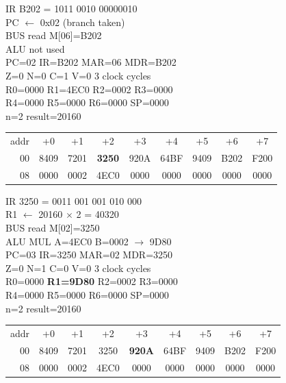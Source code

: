 \noindent\begin{tcolorbox}[stepbox, title={Step 32 \hfill PC 06 \quad BNE loop}]
\textcolor{dim}{IR} B202 = 1011 0010 00000010\\
PC $\leftarrow$ 0x02 (branch taken)\\
\textcolor{dim}{BUS} read M[06]=B202\\
\textcolor{dim}{ALU} \textcolor{dim}{not used}\\
PC=02 IR=B202 MAR=06 MDR=B202\\
Z=0 N=0 C=1 V=0 \hfill \textcolor{dim}{3 clock cycles}\\
R0=0000 R1=4EC0 R2=0002 R3=0000\\
R4=0000 R5=0000 R6=0000 SP=0000\\
\textcolor{dim}{n=2  result=20160}\\[1pt]
{\setlength{\tabcolsep}{1.6pt}\begin{tabular}{@{}r*{8}{c}@{}}
\textcolor{dim}{addr} & \textcolor{dim}{+0} & \textcolor{dim}{+1} & \textcolor{dim}{+2} & \textcolor{dim}{+3} & \textcolor{dim}{+4} & \textcolor{dim}{+5} & \textcolor{dim}{+6} & \textcolor{dim}{+7}\\
\textcolor{dim}{00} & 8409 & 7201 & \cellcolor{pcc}\textbf{3250} & 920A & 64BF & 9409 & B202 & F200\\
\textcolor{dim}{08} & 0000 & \cellcolor{datac}0002 & \cellcolor{datac}4EC0 & 0000 & 0000 & 0000 & 0000 & 0000\\
\end{tabular}}
\end{tcolorbox}\hfill\begin{tcolorbox}[stepbox, title={Step 33 \hfill PC 02 \quad MUL R1, R1, R2}]
\textcolor{dim}{IR} 3250 = 0011 001 001 010 000\\
R1 $\leftarrow$ 20160 $\times$ 2 = 40320\\
\textcolor{dim}{BUS} read M[02]=3250\\
\textcolor{dim}{ALU} MUL A=4EC0 B=0002 $\rightarrow$ 9D80\\
PC=03 IR=3250 MAR=02 MDR=3250\\
Z=0 N=1 C=0 V=0 \hfill \textcolor{dim}{3 clock cycles}\\
R0=0000 \textcolor{wrt}{\textbf{R1=9D80}} R2=0002 R3=0000\\
R4=0000 R5=0000 R6=0000 SP=0000\\
\textcolor{dim}{n=2  result=20160}\\[1pt]
{\setlength{\tabcolsep}{1.6pt}\begin{tabular}{@{}r*{8}{c}@{}}
\textcolor{dim}{addr} & \textcolor{dim}{+0} & \textcolor{dim}{+1} & \textcolor{dim}{+2} & \textcolor{dim}{+3} & \textcolor{dim}{+4} & \textcolor{dim}{+5} & \textcolor{dim}{+6} & \textcolor{dim}{+7}\\
\textcolor{dim}{00} & 8409 & 7201 & 3250 & \cellcolor{pcc}\textbf{920A} & 64BF & 9409 & B202 & F200\\
\textcolor{dim}{08} & 0000 & \cellcolor{datac}0002 & \cellcolor{datac}4EC0 & 0000 & 0000 & 0000 & 0000 & 0000\\
\end{tabular}}
\end{tcolorbox}\par\vspace{3pt}
